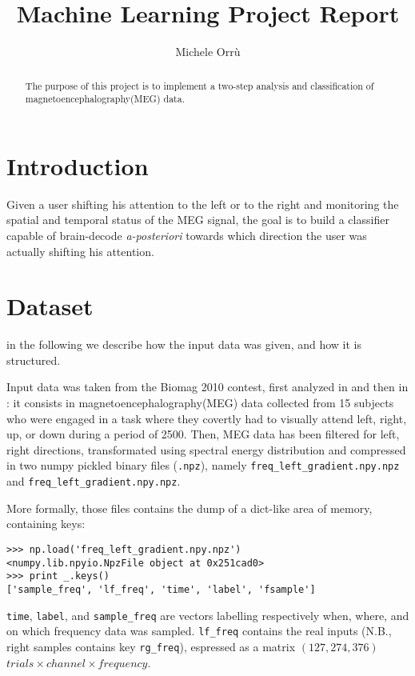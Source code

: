 \documentclass[10pt]{article}
\title{\textbf{Machine Learning Project Report }}
\author{Michele Orr\`u}
\begin{document}
\newcommand{\code}[1]{\texttt{#1}}
\maketitle
\begin{abstract}
The purpose of this project is to implement a two-step analysis and classification of magnetoencephalography(MEG) data. 
\end{abstract}


\section{Introduction}
Given a user shifting his attention to the left or to the right and monitoring the spatial and temporal status of the MEG\cite{Biomag2010} signal, the goal is to build a classifier capable of brain-decode \textit{a-posteriori} towards which direction the user was actually shifting his attention.



\section{Dataset}
\label{dataset}
in the following we describe how the input data was given, and how it is structured. 

\noindent
Input data was taken from the Biomag 2010 contest, first analyzed in 
\cite{Biomag2010} and then in \cite{Braindecoding}: it consists in
 magnetoencephalography(MEG) data collected from 15 subjects who were engaged in
a task where they covertly had to visually attend left, right, up, or down during a
period of 2500\milli\second. 
Then, MEG data has been filtered for left, right directions, transformated using spectral energy distribution and compressed in two numpy pickled binary files
 (\code{.npz}), namely \code{freq\_left\_gradient.npy.npz}
 and \code{freq\_left\_gradient.npy.npz}.

More formally, those files contains the dump of a dict-like area of memory, containing keys:
\begin{verbatim}
>>> np.load('freq_left_gradient.npy.npz')
<numpy.lib.npyio.NpzFile object at 0x251cad0>
>>> print _.keys()
['sample_freq', 'lf_freq', 'time', 'label', 'fsample']
\end{verbatim}

\code{time}, \code{label}, and \code{sample\_freq} are vectors labelling respectively when, where, and on which frequency data was sampled.
\code{lf\_freq} contains the real inputs (N.B., right samples contains key \code{rg\_freq}), espressed as a matrix $(127, 274, 376)$ $trials \times channel \times frequency$.
\end{document}
